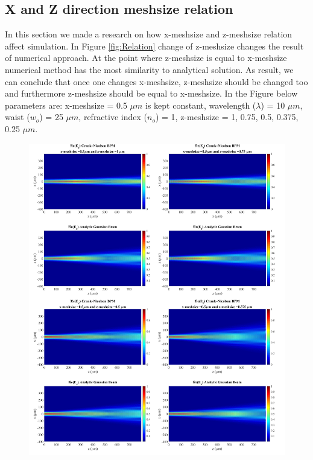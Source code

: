 \documentclass{article}
\begin{document}
	\subsection{X and Z direction meshsize relation}
	In this section we made a research on how x-meshsize and z-meshsize relation affect simulation. In Figure \ref{fig:Relation} change of z-meshsize changes the result of numerical approach. At the point where z-meshsize is equal to x-meshsize numerical method has the most similarity to analytical solution. As result, we can conclude that once one changes x-meshsize, z-meshsize should be changed too and furthermore z-meshsize should be equal to x-meshsize. In the Figure below parameters are: x-meshsize  = 0.5 $\mu m$ is kept constant, wavelength ($\lambda$) = 10 $\mu m$, waist ($w_o$) = 25 $\mu m$, refractive index ($n_o$) = 1, z-meshsize = 1, 0.75, 0.5, 0.375, 0.25 $\mu m$.
%	
	\begin{figure}[H]
		\hspace{-22.5mm}
		\includegraphics[width=1.35\textwidth]{change1234.jpg}	
	\end{figure}
	
\end{document}
